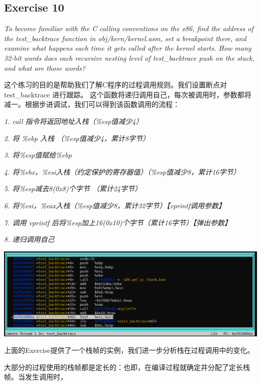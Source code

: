 \documentclass[12pt, letterpaper]{report}
\begin{document}
\subsection{\large Exercise 10}
\textsl{To become familiar with the C calling conventions on the x86, 
        find the address of the test\_backtrace function in obj/kern/kernel.asm, 
        set a breakpoint there, and examine what happens each time it gets called after the kernel starts. 
        How many 32-bit words does each recursive nesting level of test\_backtrace push on the stack, 
        and what are those words?} \par
\quad \par 
这个练习的目的是帮助我们了解C程序的过程调用规则。我们设置断点对 test\_backtrace 进行跟踪。
这个函数将递归调用自己，每次被调用时，参数都将减一。根据步进调试，我们可以得到该函数调用的流程：\par
\quad
\textsl{1. call 指令将返回地址入栈（\%esp值减少4）} \par 
\quad
\textsl{2. 将 \%ebp 入栈 （\%esp值减少4，累计8字节）} \par 
\quad
\textsl{3. 将\%esp值赋给\%ebp } \par 
\quad
\textsl{4. 将\%ebx，\%esi入栈（约定保护的寄存器值）（\%esp值减少8，累计16字节）} \par 
\quad
\textsl{5. 将\%esp减去8(0x8)个字节 （累计24字节）} \par 
\quad 
\textsl{6. 将\%esi，\%eax入栈（\%esp值减少8，累计32字节）【vprintf调用参数】} \par 
\quad
\textsl{7. 调用 vprintf 后将\%esp加上16(0x10)个字节（累计16字节）【弹出参数】} \par
\quad 
\textsl{8. 递归调用自己}  \par 
\quad \par 
\includegraphics[width=\textwidth]{test_backtrace}
\quad \par
上面的Exercise提供了一个栈帧的实例，我们进一步分析栈在过程调用中的变化。\par 
大部分的过程使用的栈帧都是定长的：也即，在编译过程就确定并分配了定长栈帧。当发生调用时，
\end{document}
